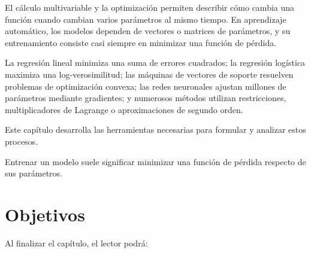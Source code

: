 \documentclass[
  spanish,
  10.5pt,
  letterpaper,
  DIV=11,
  numbers=noendperiod,
  oneside,
  open=any]{scrreprt}
\theoremstyle{definition}
\theoremstyle{definition}
\theoremstyle{plain}
\theoremstyle{remark}
\begin{document}
El cálculo multivariable y la optimización permiten describir cómo
cambia una función cuando cambian varios parámetros al mismo tiempo. En
aprendizaje automático, los modelos dependen de vectores o matrices de
parámetros, y su entrenamiento consiste casi siempre en minimizar una
función de pérdida.

La regresión lineal minimiza una suma de errores cuadrados; la regresión
logística maximiza una log-verosimilitud; las máquinas de vectores de
soporte resuelven problemas de optimización convexa; las redes
neuronales ajustan millones de parámetros mediante gradientes; y
numerosos métodos utilizan restricciones, multiplicadores de Lagrange o
aproximaciones de segundo orden.

Este capítulo desarrolla las herramientas necesarias para formular y
analizar estos procesos.

\begin{tcolorbox}[enhanced jigsaw, arc=.35mm, bottomrule=.15mm, bottomtitle=1mm, breakable, colback=white, colbacktitle=quarto-callout-important-color!10!white, colframe=quarto-callout-important-color-frame, coltitle=black, left=2mm, leftrule=.75mm, opacityback=0, opacitybacktitle=0.6, rightrule=.15mm, title=\textcolor{quarto-callout-important-color}{\faExclamation}\hspace{0.5em}{Idea central}, titlerule=0mm, toprule=.15mm, toptitle=1mm]

Entrenar un modelo suele significar minimizar una función de pérdida
respecto de sus parámetros.

\end{tcolorbox}

\section*{Objetivos}\label{objetivos-3}


Al finalizar el capítulo, el lector podrá:
\end{document}
